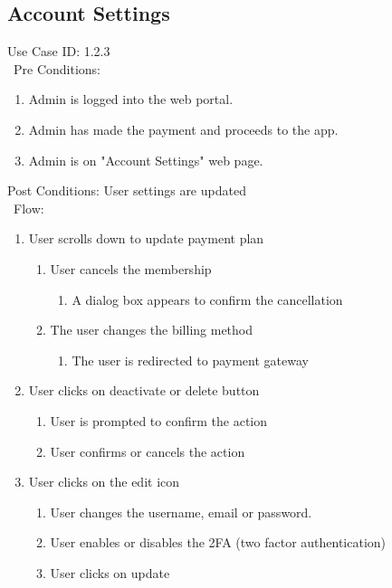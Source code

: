 \subsection{Account Settings} 
Use Case ID: 1.2.3\\\
Pre Conditions:
\begin{enumerate}
    \item Admin is logged into the web portal. 
    \item Admin has made the payment and proceeds to the app.
    \item Admin is on "Account Settings" web page.
\end{enumerate}
Post Conditions: User settings are updated\\\
Flow: 
\begin{enumerate}
    \item User scrolls down to update payment plan
    \begin{enumerate}
        \item User cancels the membership
        \begin{enumerate}
            \item A dialog box appears to confirm the cancellation
        \end{enumerate}
        \item The user changes the billing method
        \begin{enumerate}
            \item The user is redirected to payment gateway
        \end{enumerate}
    \end{enumerate}
    \item User clicks on deactivate or delete button
    \begin{enumerate}
        \item User is prompted to confirm the action
        \item User confirms or cancels the action
    \end{enumerate}
    \item User clicks on the edit icon
    \begin{enumerate}
        \item User changes the username, email or password.
    \item User enables or disables the 2FA (two factor authentication)
    \item User clicks on update
    \end{enumerate}
\end{enumerate}
